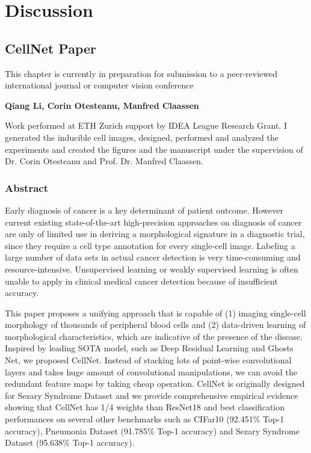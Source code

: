 \chapter{Discussion}
\label{sec:examples}

\section{CellNet Paper}
\label{sec:lorem}

This chapter is currently in preparation for submission to a peer-reviewed international journal or computer vision conference

\textbf{Qiang Li, Corin Otesteanu, Manfred Claassen}

Work performed at ETH Zurich support by IDEA League Research Grant.
I generated the inducible cell images, designed, performed and analyzed the experiments and created the figures and the manuscript under the supervision of Dr. Corin Otesteanu and Prof. Dr. Manfred Claassen.

\subsection{Abstract}
\label{sec:abstract}
Early diagnosis of cancer is a key determinant of patient outcome. However current existing state-of-the-art high-precision approaches on diagnosis of cancer are only of limited use in deriving a morphological signature in a diagnostic trial, since they require a cell type annotation for every single-cell image. Labeling a large number of data sets in actual cancer detection is very time-consuming and resource-intensive. Unsupervised learning or weakly supervised learning is often unable to apply in clinical medical cancer detection because of insufficient accuracy.

This paper proposes a unifying approach that is capable of (1) imaging single-cell morphology of thousands of peripheral blood cells and (2) data-driven learning of morphological characteristics, which are indicative of the presence of the disease.
Inspired by leading SOTA model, such as Deep Residual Learning\cite{20} and Ghosts Net\cite{19}, we proposed CellNet. Instead of stacking lots of point-wise convolutional layers and takes huge amount of convolutional manipulations, we can avoid the redundant feature maps by taking cheap operation. CellNet is originally designed for Sezary Syndrome Dataset and we provide comprehensive empirical evidence showing that CellNet has 1/4 weights than ResNet18 \cite{20} and best classification performances on several other benchmarks such as CIFar10 \cite{21} (92.451\% Top-1 accuracy), Pneumonia Dataset\cite{38} (91.785\% Top-1 accuracy) and Sezary Syndrome Dataset (95.638\% Top-1 accuracy).

